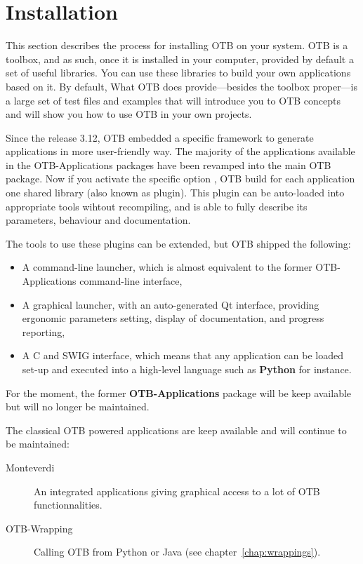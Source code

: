 \chapter{Installation}
\label{chapter:Installation}

This section describes the process for installing OTB on your system. 
OTB is a toolbox, and as such, once it is installed in your computer, provided by default a set of useful libraries. You can use
these libraries to build your own applications based on it. By default,  
What OTB does provide---besides the toolbox proper---is a
large set of test files and examples that will introduce you to OTB concepts
and will show you how to use OTB in your own projects. 

Since the release 3.12, OTB embedded a specific framework to generate applications
in more user-friendly way. The majority of the applications available in the
OTB-Applications packages have been revamped into the main OTB package. Now if you 
activate the specific option , OTB build for each 
application one shared library (also known as plugin). This plugin can be
auto-loaded into appropriate tools wihtout recompiling, and is able to
fully describe its parameters, behaviour and documentation.

The tools to use these plugins can be extended, but OTB shipped the
following:
\begin{itemize}
\item A command-line launcher, which is almost equivalent to the former
  OTB-Applications command-line interface,
\item A graphical launcher, with an auto-generated Qt interface,
  providing ergonomic parameters setting, display of documentation,
  and progress reporting,
\item A C and SWIG interface, which means that any application can be
  loaded set-up and executed into a high-level language such as \textbf{Python}
  for instance.
\end{itemize}  

For the moment, the former \textbf{OTB-Applications} package will be keep available 
but will no longer be maintained.

The classical OTB powered applications are keep available and will continue
to be maintained:
\begin{description}
\item [Monteverdi]{An integrated applications giving graphical access to a lot of OTB 
functionnalities.}
\item[OTB-Wrapping]{Calling OTB from Python or Java (see chapter~\ref{chap:wrappings}).}
\end{description}


